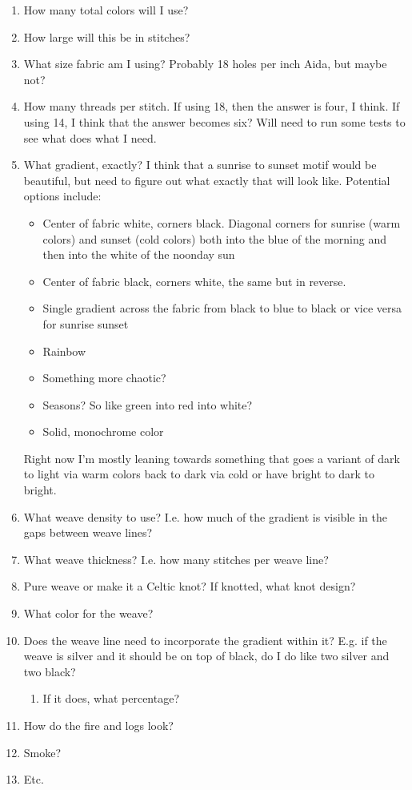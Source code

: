 \documentclass[12pt]{article}
\renewcommand{\,}{\textsuperscript{,}}
\begin{document}
\begin{enumerate}

\item How many total colors will I use?  
\item How large will this be in stitches?  
\item What size fabric am I using? Probably 18 holes per inch Aida, but maybe not?  
\item How many threads per stitch. If using 18, then the answer is four, I think. If using 14, I think that the answer becomes six? Will need to run some tests to see what does what I need.  
\item What gradient, exactly? I think that a sunrise to sunset motif would be beautiful, but need to figure out what exactly that will look like. Potential options include:  
\begin{itemize}

\item Center of fabric white, corners black. Diagonal corners for sunrise (warm colors) and sunset (cold colors) both into the blue of the morning and then into the white of the noonday sun  
\item Center of fabric black, corners white, the same but in reverse.  
\item Single gradient across the fabric from black to blue to black or vice versa for sunrise sunset  
\item Rainbow  
\item Something more chaotic?  
\item Seasons? So like green into red into white?  
\item Solid, monochrome color  
\end{itemize}

Right now I'm mostly leaning towards something that goes a variant of dark to light via warm colors back to dark via cold or have bright to dark to bright.

\item What weave density to use? I.e. how much of the gradient is visible in the gaps between weave lines?  
\item What weave thickness? I.e. how many stitches per weave line?  
\item Pure weave or make it a Celtic knot? If knotted, what knot design?  
\item What color for the weave?  
\item Does the weave line need to incorporate the gradient within it? E.g. if the weave is silver and it should be on top of black, do I do like two silver and two black?  
\begin{enumerate}  
\item If it does, what percentage?  
\end{enumerate}

\item How do the fire and logs look?  
\item Smoke?  
\item Etc.

\end{enumerate}
\end{document}
